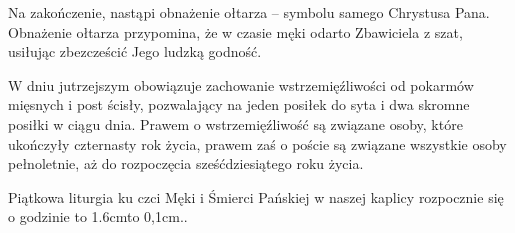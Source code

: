 \documentclass[10pt,oneside,final,notitlepage,a4paper,wide]{mwart}
\def\dotfill#1{\cleaders\hbox to #1{.}\hfill}
\newcommand\dotline[2][0,1cm]{\leavevmode\hbox to #2{\dotfill{#1}\hfil}}
\begin{document}
Na zakończenie, nastąpi obnażenie ołtarza -- symbolu samego Chrystusa Pana. Obnażenie ołtarza przypomina, że w czasie męki odarto Zbawiciela z szat, usiłując zbezcześcić Jego ludzką godność.

W dniu jutrzejszym obowiązuje zachowanie wstrzemięźliwości od pokarmów mięsnych i post ścisły, pozwalający na jeden posiłek do syta i dwa skromne posiłki w ciągu dnia. Prawem o wstrzemięźliwość są związane osoby, które ukończyły czternasty rok życia, prawem zaś o poście są związane wszystkie osoby pełnoletnie, aż do rozpoczęcia sześćdziesiątego roku życia.

Piątkowa liturgia ku czci Męki i Śmierci Pańskiej w naszej kaplicy rozpocznie się o godzinie \dotline{1.6cm}.
\end{document}
